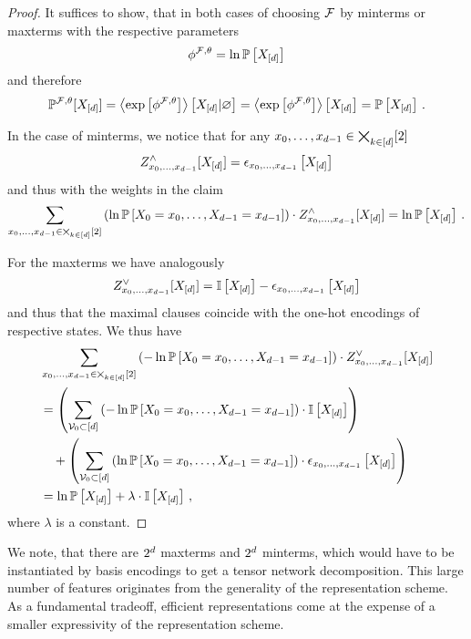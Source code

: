 \begin{proof}
    It suffices to show, that in both cases of choosing $\mathcal{F}$ by minterms or maxterms with the respective parameters
    \[ \phi^{\mathcal{F},\theta} =  \ln\mathbb{P}\left[X_{[d]}\right] \]
    and therefore
    \[ \mathbb{P}^{\mathcal{F},\theta}[X_{[d]}]
    = \left\langle \mathrm{exp}\left[\phi^{\mathcal{F},\theta}\right]\right\rangle \left[ X_{[d]} | \varnothing \right]
    =  \left\langle \mathrm{exp}\left[\phi^{\mathcal{F},\theta}\right]\right\rangle \left[ X_{[d]} \right]
    = \mathbb{P}\left[X_{[d]}\right]\, . \]

    In the case of minterms, we notice that for any ${x_{0},\ldots,x_{d-1}}\in\bigtimes_{k\in[d]}[2]$
    \[ Z^{\land}_{{x_{0},\ldots,x_{d-1}}}[X_{[d]}] = \epsilon_{{x_{0},\ldots,x_{d-1}}}\left[X_{[d]}\right] \]
    and thus with the weights in the claim
    \[ \sum_{{x_{0},\ldots,x_{d-1}}\in\bigtimes_{k\in[d]}[2]}
    \left( \ln \mathbb{P}\left[X_{0}=x_{0},\ldots,X_{d-1}=x_{d-1}\right] \right) \cdot Z^{\land}_{{x_{0},\ldots,x_{d-1}}}[X_{[d]}]
    = \ln\mathbb{P}\left[X_{[d]}\right] \, .
    \]

    For the maxterms we have analogously
    \[ Z^{\lor}_{{x_{0},\ldots,x_{d-1}}}[X_{[d]}] = \mathbb{I}\left[X_{[d]}\right] - \epsilon_{x_{0},\ldots,x_{d-1}}\left[X_{[d]}\right] \]
    and thus that the maximal clauses coincide with the one-hot encodings of respective states.
    We thus have
    \begin{align*}
        & \sum_{{x_{0},\ldots,x_{d-1}}\in\bigtimes_{k\in[d]}[2]}
        \left( - \ln \mathbb{P}\left[X_{0}=x_{0},\ldots,X_{d-1}=x_{d-1}\right] \right) \cdot Z^{\lor}_{{x_{0},\ldots,x_{d-1}}}[X_{[d]}] \\
        & =
        \left(  \sum_{\mathcal{V}_0\subset [d]}
        \left( - \ln \mathbb{P}\left[X_{0}=x_{0},\ldots,X_{d-1}=x_{d-1}\right] \right) \cdot \mathbb{I}\left[X_{[d]}\right] \right) \\
        & \quad +
        \left(  \sum_{\mathcal{V}_0\subset [d]}
        \left(  \ln \mathbb{P}\left[X_{0}=x_{0},\ldots,X_{d-1}=x_{d-1}\right] \right) \cdot
        \epsilon_{x_{0},\ldots,x_{d-1}}\left[X_{[d]}\right]
        \right)
        \\
        & = \ln\mathbb{P}\left[X_{[d]}\right] + \lambda \cdot  \mathbb{I}\left[X_{[d]}\right]\,,
    \end{align*}
    where $\lambda$ is a constant.
\end{proof}

We note, that there are $2^{d}$ maxterms and $2^{d}$ minterms, which would have to be instantiated by basis encodings to get a tensor network decomposition.
This large number of features originates from the generality of the representation scheme.
As a fundamental tradeoff, efficient representations come at the expense of a smaller expressivity of the representation scheme.


